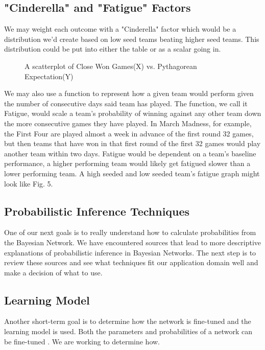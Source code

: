 \documentclass{acm_proc_article-sp}
\begin{document}
\subsection{"Cinderella" and "Fatigue" Factors}
We may weight each outcome with a "Cinderella" factor which would be a distribution we'd create 
based on low seed teams beating higher seed teams. This distribution could be put into either the 
table or as a scalar going in.
\begin{figure}
\centering
{}
\caption{A scatterplot of Close Won Games(X) vs. Pythagorean Expectation(Y)}
\end{figure}
We may also use a function to represent how a given team would perform given the number of 
consecutive days said team has played. The function, we call it Fatigue, would scale a team's 
probability of winning against any other team down the more consecutive games they have played. In 
March Madness, for example, the First Four are played almost a week in advance of the first round 32 
games, but then teams that have won in that first round of the first 32 games would play another team within two days. Fatigue would be dependent on a team's 
baseline performance, a higher performing team would likely get fatigued slower than a lower 
performing team. A high seeded and low seeded team's fatigue graph might look like Fig. 5.
\subsection{Probabilistic Inference Techniques}
One of our next goals is to really understand how to calculate probabilities from the Bayesian 
Network. We have encountered sources that lead to more descriptive explanations of probabilistic 
inference in Bayesian Networks. The next step is to review these sources and see what techniques fit 
our application domain well and make a decision of what to use.\cite{ruiz, ben}
\subsection{Learning Model}
Another short-term goal is to determine how the network is fine-tuned and the learning model is 
used. Both the parameters and probabilities of a network can be fine-tuned \cite{heckerman}. 
We are working to determine how. 
\newpage


\end{document}
